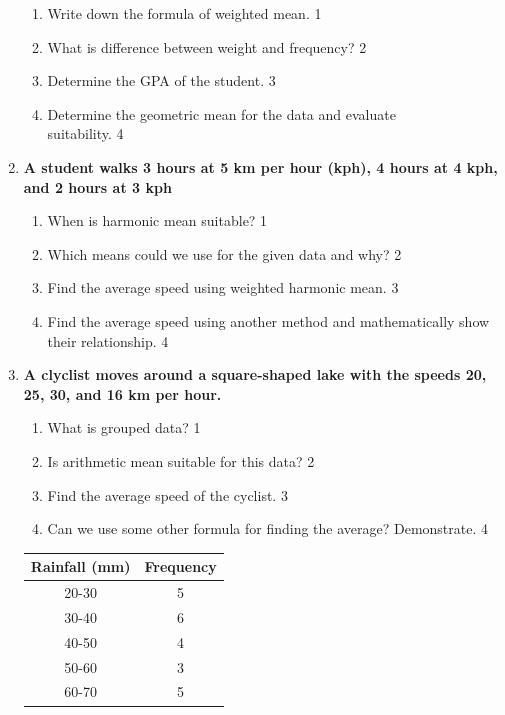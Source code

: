 \documentclass[a4paper,oneside]{book}
\begin{document}
\begin{enumerate}
  
  \begin{enumerate}
    \item
	Write down the formula of weighted mean. \hfill 1
    \item
	What is difference between weight and frequency? \hfill 2
    \item  
	Determine the GPA of the student. \hfill 3
    \item
	Determine the geometric mean for the data and evaluate \\ suitability. \hfill 4
  \end{enumerate}

 \item
	  \textbf{A student walks 3 hours at 5 km per hour (kph), 4 hours at 4 kph, and 2 hours at 3 kph} 
  
  \begin{enumerate}
    \item
	When is harmonic mean suitable? \hfill 1
    \item
	Which means could we use for the given data and why? \hfill 2
    \item  
	Find the average speed using weighted harmonic mean. \hfill 3
    \item
	Find the average speed using another method and mathematically show their relationship. \hfill 4
  \end{enumerate}

 \item
	  \textbf{A clyclist moves around a square-shaped lake with the speeds 20, 25, 30, and 16 km per hour.} 
  
  \begin{enumerate}
    \item
	What is grouped data? \hfill 1
    \item
	Is arithmetic mean suitable for this data? \hfill 2
    \item  
	Find the average speed of the cyclist. \hfill 3
    \item
	Can we use some other formula for finding the average? Demonstrate. \hfill 4
  \end{enumerate}

    \begin{table}[h]
    \centering
\begin{tabular}{c|c}
\textbf{Rainfall (mm)} & \textbf{Frequency} \\ \hline
20-30                  & 5                  \\ \hline
30-40                  & 6                  \\ \hline
40-50                  & 4                  \\ \hline
50-60                  & 3                  \\
60-70                  & 5                 
\end{tabular}
\end{table}
\end{enumerate}
\end{document}
